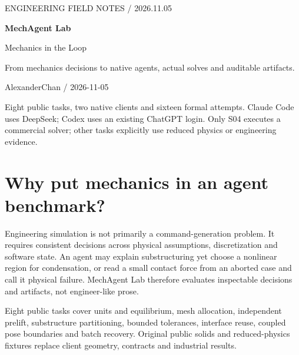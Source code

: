 \documentclass[11pt,a4paper]{ctexart}
\begin{document}
\thispagestyle{empty}

\renewcommand{\contentsname}{Contents}\renewcommand{\figurename}{Figure}

{\sffamily\color{Teal}ENGINEERING FIELD NOTES / 2026.11.05}\par\vspace{1em}

{\Huge\bfseries\color{Ink}MechAgent Lab}\par\vspace{.5em}

{\LARGE Mechanics in the Loop}\par\vspace{1em}

From mechanics decisions to native agents, actual solves and auditable artifacts.

\par AlexanderChan / 2026-11-05\par\vspace{1em}

Eight public tasks, two native clients and sixteen formal attempts. Claude Code uses DeepSeek; Codex uses an existing ChatGPT login. Only S04 executes a commercial solver; other tasks explicitly use reduced physics or engineering evidence.

\tableofcontents\newpage

\section{Why put mechanics in an agent benchmark?}

Engineering simulation is not primarily a command-generation problem. It requires consistent decisions across physical assumptions, discretization and software state. An agent may explain substructuring yet choose a nonlinear region for condensation, or read a small contact force from an aborted case and call it physical failure. MechAgent Lab therefore evaluates inspectable decisions and artifacts, not engineer-like prose.

\par

Eight public tasks cover units and equilibrium, mesh allocation, independent prelift, substructure partitioning, bounded tolerances, interface reuse, coupled pose boundaries and batch recovery. Original public solids and reduced-physics fixtures replace client geometry, contracts and industrial results.

\par
\end{document}
